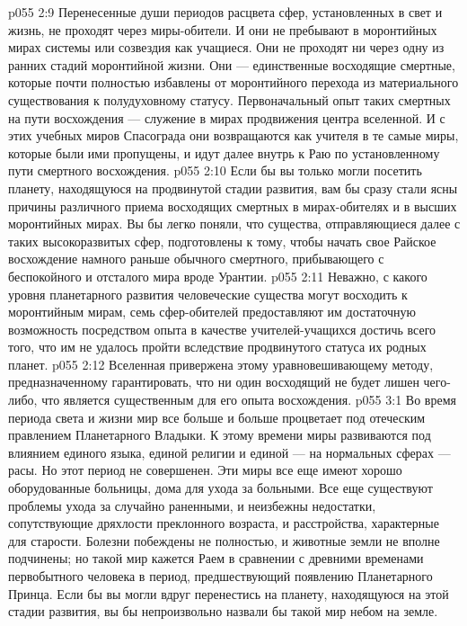 \vs p055 2:9 \pc Перенесенные души периодов расцвета сфер, установленных в свет и жизнь, не проходят через миры\hyp{}обители. И они не пребывают в моронтийных мирах системы или созвездия как учащиеся. Они не проходят ни через одну из ранних стадий моронтийной жизни. Они --- единственные восходящие смертные, которые почти полностью избавлены от моронтийного перехода из материального существования к полудуховному статусу. Первоначальный опыт таких  смертных на пути восхождения --- служение в мирах продвижения центра вселенной. И с этих учебных миров Спасограда они возвращаются как учителя в те самые миры, которые были ими пропущены, и идут далее внутрь к Раю по установленному пути смертного восхождения.
\vs p055 2:10 Если бы вы только могли посетить планету, находящуюся на продвинутой стадии развития, вам бы сразу стали ясны причины различного приема восходящих смертных в мирах\hyp{}обителях и в высших моронтийных мирах. Вы бы легко поняли, что существа, отправляющиеся далее с таких высокоразвитых сфер, подготовлены к тому, чтобы начать свое Райское восхождение намного раньше обычного смертного, прибывающего с беспокойного и отсталого мира вроде Урантии.
\vs p055 2:11 Неважно, с какого уровня планетарного развития человеческие существа могут восходить к моронтийным мирам, семь сфер\hyp{}обителей предоставляют им достаточную возможность посредством опыта в качестве учителей\hyp{}учащихся достичь всего того, что им не удалось пройти вследствие продвинутого статуса их родных планет.
\vs p055 2:12 Вселенная привержена этому уравновешивающему методу, предназначенному гарантировать, что ни один восходящий не будет лишен чего\hyp{}либо, что является существенным для его опыта восхождения.
\vs p055 3:1 Во время периода света и жизни мир все больше и больше процветает под отеческим правлением Планетарного Владыки. К этому времени миры развиваются под влиянием единого языка, единой религии и единой --- на нормальных сферах --- расы. Но этот период не совершенен. Эти миры все еще имеют хорошо оборудованные больницы, дома для ухода за больными. Все еще существуют проблемы ухода за случайно раненными, и неизбежны недостатки, сопутствующие дряхлости преклонного возраста, и расстройства, характерные для старости. Болезни побеждены не полностью, и животные земли не вполне подчинены; но такой мир кажется Раем в сравнении с древними временами первобытного человека в период, предшествующий появлению Планетарного Принца. Если бы вы могли вдруг перенестись на планету, находящуюся на этой стадии развития, вы бы непроизвольно назвали бы такой мир небом на земле.
